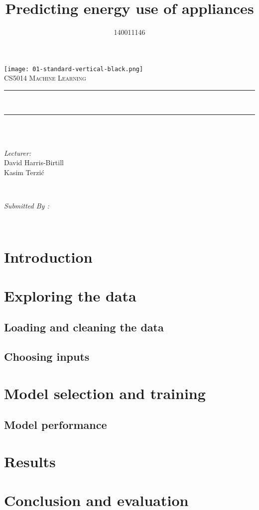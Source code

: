 \documentclass{article}
\title{Predicting energy use of appliances}
\author{140011146}
\makeatletter
\newcommand{\maketitlepage}[2]{
\begin{titlepage}
	\centering
    \texttt{[image: 01-standard-vertical-black.png]}\\	%
	\textsc{\LARGE #1}\\[0.5 cm]				%
	\rule{\linewidth}{0.2 mm} \\[0.4 cm]
	{ \huge \bfseries \thetitle}
	\rule{\linewidth}{0.2 mm} \\[0.5 cm]
	\textsc{\large \thedate}\\[1.5 cm]
	
	\begin{minipage}{0.4\textwidth}
		\begin{flushleft} \large
			\emph{Lecturer:}\\
			#2
			\end{flushleft}
			\end{minipage}~
			\begin{minipage}{0.4\textwidth}
            
			\begin{flushright} \large
			\emph{Submitted By :} \\
			\theauthor
		\end{flushright}
        
	\end{minipage}\\[2 cm]
	
\end{titlepage}
}
\let\thetitle\@title
\let\theauthor\@author
\let\thedate\@date
\makeatother
\begin{document}
\maketitlepage{CS5014 Machine Learning}{David Harris-Birtill\\Kasim Terzi\'{c}}




\section{Introduction}

\section{Exploring the data}

\subsection{Loading and cleaning the data}

\subsection{Choosing inputs}


\section{Model selection and training}

\subsection{Model performance}

\section{Results}

\section{Conclusion and evaluation}

\end{document}

